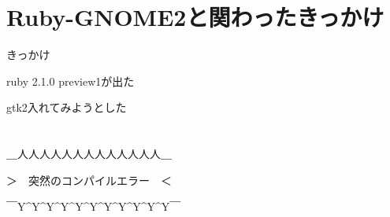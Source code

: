 \section{Ruby-GNOME2と関わったきっかけ}
\begin{frame}
\begin{block}{きっかけ}
\begin{itemize}
{\Large
\item ruby 2.1.0 preview1が出た
\item gtk2入れてみようとした
}
\end{itemize}
\end{block}
\end{frame}

\section{}

\begin{frame}
\begin{center}
{\huge
＿人人人人人人人人人人人人人＿

＞　突然のコンパイルエラー　＜

￣Y\^{}Y\^{}Y\^{}Y\^{}Y\^{}Y\^{}Y\^{}Y\^{}Y\^{}Y\^{}Y￣
}
\end{center}
\end{frame}
